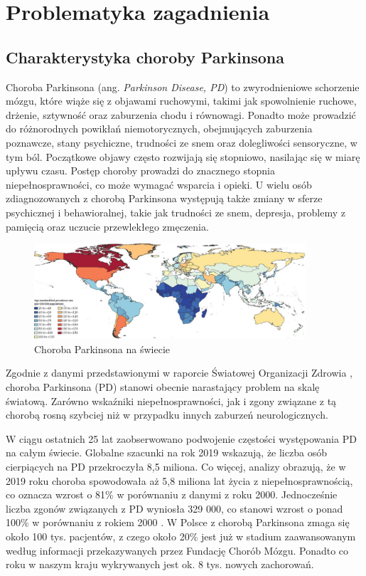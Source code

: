 \chapter{Problematyka zagadnienia}
\label{ch:problematyka}

\section{Charakterystyka choroby Parkinsona}
\label{sec:charakterystykaPD}

Choroba Parkinsona (ang. \emph {Parkinson Disease,  PD}) to zwyrodnieniowe schorzenie mózgu, które wiąże się z objawami ruchowymi, takimi jak spowolnienie ruchowe,
drżenie, sztywność oraz zaburzenia chodu i równowagi.
Ponadto może prowadzić do różnorodnych powikłań niemotorycznych, obejmujących zaburzenia poznawcze, stany psychiczne,
trudności ze snem oraz dolegliwości sensoryczne, w tym ból.
Początkowe objawy często rozwijają się stopniowo, nasilając się w miarę upływu czasu.
Postęp choroby prowadzi do znacznego stopnia niepełnosprawności, co może wymagać wsparcia i opieki.
U wielu osób zdiagnozowanych z chorobą Parkinsona występują także zmiany w sferze psychicznej i behawioralnej, takie jak
trudności ze snem, depresja, problemy z pamięcią oraz uczucie przewlekłego zmęczenia.

\begin{figure}[htbp]
	\centering
	\includegraphics[width=0.9\textwidth]{./img/map}
	\caption{Choroba Parkinsona na świecie \cite{global_PD}}
    \label{fig:PD_map}
\end{figure}

Zgodnie z danymi przedstawionymi w raporcie Światowej Organizacji Zdrowia \cite{WHO}, choroba Parkinsona (PD) stanowi obecnie narastający problem na skalę światową. Zarówno wskaźniki niepełnosprawności, jak i zgony związane z tą chorobą rosną szybciej niż w przypadku innych zaburzeń neurologicznych.

W ciągu ostatnich 25 lat zaobserwowano podwojenie częstości występowania PD na całym świecie.
Globalne szacunki na rok 2019 wskazują, że liczba osób cierpiących na PD przekroczyła 8,5 miliona.
Co więcej, analizy obrazują, że w 2019 roku choroba spowodowała aż 5,8 miliona lat życia z niepełnosprawnością, co oznacza wzrost o 81\% w porównaniu z danymi z roku 2000.
Jednocześnie liczba zgonów związanych z PD wyniosła 329 000, co stanowi wzrost o ponad 100\% w porównaniu z rokiem 2000 \cite{global_PD}.
W Polsce z chorobą Parkinsona zmaga się około 100 tys. pacjentów, z czego około 20\% jest już w stadium zaawansowanym
według informacji przekazywanych przez Fundację Chorób Mózgu.
Ponadto co roku w naszym kraju wykrywanych jest ok. 8 tys. nowych zachorowań.

